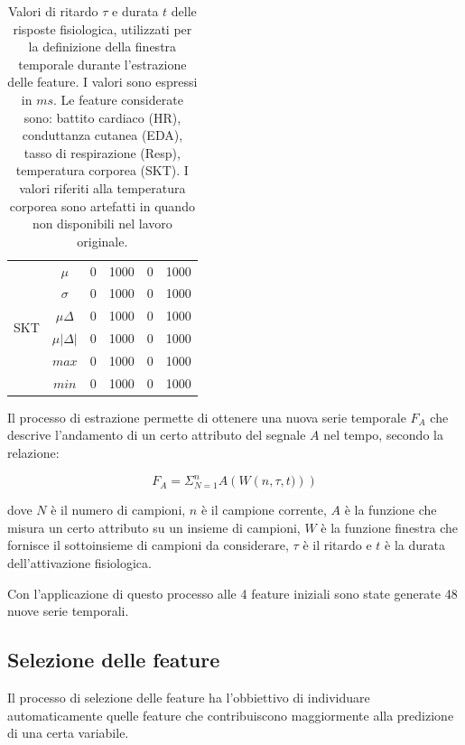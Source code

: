\begin{table}[]
\begin{tabular}{|c|c|cc|cc|}
\hline
\multirow{6}{*}{SKT} & $\mu$                      & 0    & 1000 & 0    & 1000 \\
                     & $\sigma$                   & 0    & 1000 & 0    & 1000 \\
                     & $\mu\Delta$                & 0    & 1000 & 0    & 1000 \\
                     & $\mu\left|\Delta\right|$   & 0    & 1000 & 0    & 1000 \\
                     & $max$                      & 0    & 1000 & 0    & 1000 \\
                     & $min$                      & 0    & 1000 & 0    & 1000 \\
\hline
\end{tabular}%
\caption{Valori di ritardo $\tau$ e durata $t$ delle risposte fisiologica, utilizzati per la definizione della finestra temporale durante l'estrazione delle feature. I valori sono espressi in $ms$. Le feature considerate sono: battito cardiaco (HR), conduttanza cutanea (EDA), tasso di respirazione (Resp), temperatura corporea (SKT). I valori riferiti alla temperatura corporea sono artefatti in quando non disponibili nel lavoro originale.}
\label{tab:async_window_values}
\end{table}

Il processo di estrazione permette di ottenere una nuova serie temporale $F_A$ che descrive l'andamento di un certo attributo del segnale $A$ nel tempo, secondo la relazione:

\begin{equation}
F_A = \Sigma_{N=1}^{n}A\left(W\left(n,\tau,t)\right)\right)
\end{equation}

dove $N$ è il numero di campioni, $n$ è il campione corrente, $A$ è la funzione che misura un certo attributo su un insieme di campioni, $W$ è la funzione finestra che fornisce il sottoinsieme di campioni da considerare, $\tau$ è il ritardo e $t$ è la durata dell'attivazione fisiologica.

Con l'applicazione di questo processo alle 4 feature iniziali sono state generate 48 nuove serie temporali.

\subsection{Selezione delle feature}
Il processo di selezione delle feature ha l'obbiettivo di individuare automaticamente quelle feature che contribuiscono maggiormente alla predizione di una certa variabile.

